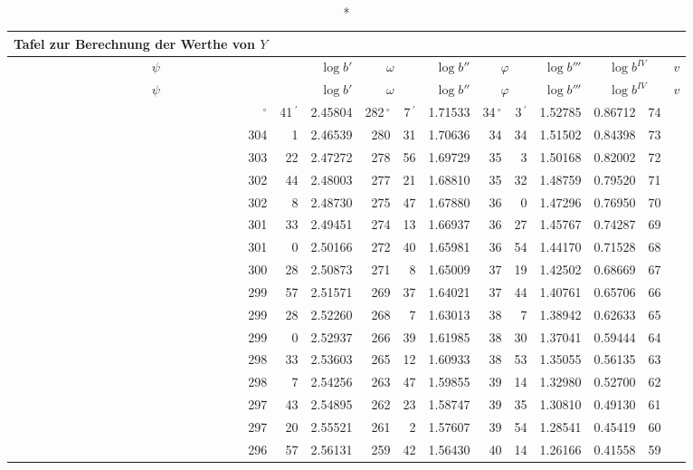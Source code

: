 \documentclass[12pt,a4paper]{article}
\newcommand{\Grad}{\,^\circ}
\newcommand{\Min}{\,^\prime}
\begin{document}
\begin{small}
\noindent\begin{longtable}{@{}rrr|rrr|rrr|rrr@{}}
\caption*{Tafel zur Berechnung der Werthe von $Y$}\\
\toprule
\multicolumn{2}{c}{$\psi$} & $\log b'$ & 
\multicolumn{2}{c}{$\omega$} & $\log b''$ &
\multicolumn{2}{c}{$\varphi$} & $\log b'''$ &
\multicolumn{2}{c}{$\log b^{IV}$} & $v$ \\
\midrule
\endfirsthead
\toprule
\multicolumn{2}{c}{$\psi$} & $\log b'$ &
\multicolumn{2}{c}{$\omega$} & $\log b''$ &
\multicolumn{2}{c}{$\varphi$} & $\log b'''$ &
\multicolumn{2}{c}{$\log b^{IV}$} & $v$ \\
\midrule
\endhead
\bottomrule
\endfoot
304$\Grad$ & 41$\Min$ & 2.45804 & 282$\Grad$ & 7$\Min$ & 1.71533 & 34$\Grad$ & 3$\Min$ & 1.52785 & 0.86712 & 74 \\
304 & 1 & 2.46539 & 280 & 31 & 1.70636 & 34 & 34 & 1.51502 & 0.84398 & 73 \\
303 & 22 & 2.47272 & 278 & 56 & 1.69729 & 35 & 3 & 1.50168 & 0.82002 & 72 \\
302 & 44 & 2.48003 & 277 & 21 & 1.68810 & 35 & 32 & 1.48759 & 0.79520 & 71 \\
302 & 8 & 2.48730 & 275 & 47 & 1.67880 & 36 & 0 & 1.47296 & 0.76950 & 70 \\
301 & 33 & 2.49451 & 274 & 13 & 1.66937 & 36 & 27 & 1.45767 & 0.74287 & 69 \\
301 & 0 & 2.50166 & 272 & 40 & 1.65981 & 36 & 54 & 1.44170 & 0.71528 & 68 \\
300 & 28 & 2.50873 & 271 & 8 & 1.65009 & 37 & 19 & 1.42502 & 0.68669 & 67 \\
299 & 57 & 2.51571 & 269 & 37 & 1.64021 & 37 & 44 & 1.40761 & 0.65706 & 66 \\
299 & 28 & 2.52260 & 268 & 7 & 1.63013 & 38 & 7 & 1.38942 & 0.62633 & 65 \\
299 & 0 & 2.52937 & 266 & 39 & 1.61985 & 38 & 30 & 1.37041 & 0.59444 & 64 \\
298 & 33 & 2.53603 & 265 & 12 & 1.60933 & 38 & 53 & 1.35055 & 0.56135 & 63 \\
298 & 7 & 2.54256 & 263 & 47 & 1.59855 & 39 & 14 & 1.32980 & 0.52700 & 62 \\
297 & 43 & 2.54895 & 262 & 23 & 1.58747 & 39 & 35 & 1.30810 & 0.49130 & 61 \\
297 & 20 & 2.55521 & 261 & 2 & 1.57607 & 39 & 54 & 1.28541 & 0.45419 & 60 \\
296 & 57 & 2.56131 & 259 & 42 & 1.56430 & 40 & 14 & 1.26166 & 0.41558 & 59 \\

\end{longtable}
\end{small}
\end{document}
